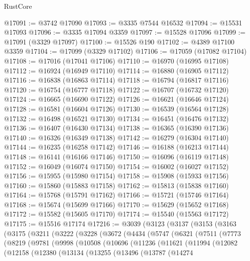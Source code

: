 \begin{lexlean}{RustCore}
\begin{coremodule}
@17091 := @3742 @17090
@17093 := @3335 @7544 @16532
@17094 := @15531 @17093
@17096 := @3335 @17094 @3359
@17097 := @15528 @17096
@17099 := @17091 (@3329 @17097)
@17100 := @15526 @190
@17102 := @4389 @17100 @3359
@17104 := @17099 (@3329 @17102)
@17106 := @17059 (@17082 @17104)
@17108 := @17016 (@17041 @17106)
@17110 := @16970 (@16995 @17108)
@17112 := @16924 (@16949 @17110)
@17114 := @16880 (@16905 @17112)
@17116 := @16838 (@16863 @17114)
@17118 := @16794 (@16817 @17116)
@17120 := @16754 (@16777 @17118)
@17122 := @16707 (@16732 @17120)
@17124 := @16665 (@16690 @17122)
@17126 := @16621 (@16646 @17124)
@17128 := @16581 (@16604 @17126)
@17130 := @16539 (@16564 @17128)
@17132 := @16498 (@16521 @17130)
@17134 := @16451 (@16476 @17132)
@17136 := @16407 (@16430 @17134)
@17138 := @16365 (@16390 @17136)
@17140 := @16326 (@16349 @17138)
@17142 := @16279 (@16304 @17140)
@17144 := @16235 (@16258 @17142)
@17146 := @16188 (@16213 @17144)
@17148 := @16141 (@16166 @17146)
@17150 := @16096 (@16119 @17148)
@17152 := @16049 (@16074 @17150)
@17154 := @16002 (@16027 @17152)
@17156 := @15955 (@15980 @17154)
@17158 := @15908 (@15933 @17156)
@17160 := @15860 (@15883 @17158)
@17162 := @15813 (@15838 @17160)
@17164 := @15768 (@15791 @17162)
@17166 := @15721 (@15746 @17164)
@17168 := @15674 (@15699 @17166)
@17170 := @15629 (@15652 @17168)
@17172 := @15582 (@15605 @17170)
@17174 := @15540 (@15563 @17172)
@17175 := @15516 @17174
@17216 := @3039
    (@3123
      (@3137
        (@3153
          (@3163
            (@3175
              (@3211
                (@3222
                  (@3228
                    (@3672
                      (@4434
                        (@5747
                          (@6321
                            (@7511
                              (@7773
                                (@8219
                                  (@9781
                                    (@9998
                                      (@10508
                                        (@10696
                                          (@11236
                                            (@11621
                                              (@11994
                                                (@12082
                                                  (@12158
                                                    (@12380
                                                      (@13134
                                                        (@13255
                                                          (@13496
                                                            (@13787
                                                              (@14274

\end{coremodule}
\end{lexlean}
